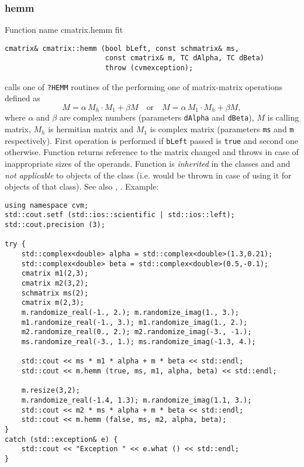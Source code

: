 \subsubsection{hemm}
Function%
\pdfdest name {cmatrix.hemm} fit
\begin{verbatim}
cmatrix& cmatrix::hemm (bool bLeft, const schmatrix& ms,
                        const cmatrix& m, TC dAlpha, TC dBeta)
                        throw (cvmexception);
\end{verbatim}
calls one of \verb"?HEMM" routines of the
performing one of 
matrix-matrix operations defined as
\begin{equation*}
M=\alpha\,M_h\cdot M_1 + \beta M\quad\text{or}\quad M=\alpha\,M_1\cdot M_h + \beta M,
\end{equation*}
where $\alpha$ and $\beta$ are complex numbers
(parameters \verb"dAlpha" and \verb"dBeta"),
$M$ is  calling matrix,
$M_h$ is  hermitian matrix and $M_1$ 
is  complex matrix (parameters \verb"ms"
and \verb"m" respectively). 
First operation is performed if \verb"bLeft" passed
is \verb"true" and second one otherwise.
Function
returns  reference to the matrix changed and throws
in case of inappropriate sizes of the operands.
Function is \emph{inherited} in  the classes
 and
 and
\emph{not applicable} to objects of the class
 (i.e.  would be thrown
in case of using it for objects of that class).
See also ,
.
Example:
\begin{Verbatim}
using namespace cvm;
std::cout.setf (std::ios::scientific | std::ios::left); 
std::cout.precision (3);

try {
    std::complex<double> alpha = std::complex<double>(1.3,0.21);
    std::complex<double> beta = std::complex<double>(0.5,-0.1);
    cmatrix m1(2,3);
    cmatrix m2(3,2);
    schmatrix ms(2);
    cmatrix m(2,3);
    m.randomize_real(-1., 2.); m.randomize_imag(1., 3.); 
    m1.randomize_real(-1., 3.); m1.randomize_imag(1., 2.);
    m2.randomize_real(0., 2.); m2.randomize_imag(-3., -1.);
    ms.randomize_real(-3., 1.); ms.randomize_imag(-1.3, 4.);

    std::cout << ms * m1 * alpha + m * beta << std::endl;
    std::cout << m.hemm (true, ms, m1, alpha, beta) << std::endl;

    m.resize(3,2);
    m.randomize_real(-1.4, 1.3); m.randomize_imag(1.1, 3.); 
    std::cout << m2 * ms * alpha + m * beta << std::endl;
    std::cout << m.hemm (false, ms, m2, alpha, beta);
}
catch (std::exception& e) {
    std::cout << "Exception " << e.what () << std::endl;
}
\end{Verbatim}

